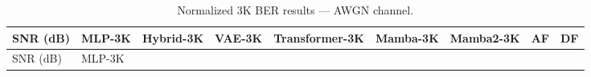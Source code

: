 \begin{longtable}[]{@{}
  >{\raggedright\arraybackslash}p{}
  >{\raggedright\arraybackslash}p{}
  >{\raggedright\arraybackslash}p{}
  >{\raggedright\arraybackslash}p{}
  >{\raggedright\arraybackslash}p{}
  >{\raggedright\arraybackslash}p{}
  >{\raggedright\arraybackslash}p{}
  >{\raggedright\arraybackslash}p{}
  >{\raggedright\arraybackslash}p{}@{}}
\caption{Normalized 3K BER results --- AWGN channel.}\label{tbl:table7}\tabularnewline
\toprule\noalign{}
\begin{minipage}[b]{\linewidth}\raggedright
SNR (dB)
\end{minipage} & \begin{minipage}[b]{\linewidth}\raggedright
MLP-3K
\end{minipage} & \begin{minipage}[b]{\linewidth}\raggedright
Hybrid-3K
\end{minipage} & \begin{minipage}[b]{\linewidth}\raggedright
VAE-3K
\end{minipage} & \begin{minipage}[b]{\linewidth}\raggedright
Transformer-3K
\end{minipage} & \begin{minipage}[b]{\linewidth}\raggedright
Mamba-3K
\end{minipage} & \begin{minipage}[b]{\linewidth}\raggedright
Mamba2-3K
\end{minipage} & \begin{minipage}[b]{\linewidth}\raggedright
AF
\end{minipage} & \begin{minipage}[b]{\linewidth}\raggedright
DF
\end{minipage} \\
\midrule\noalign{}
\endfirsthead
\toprule\noalign{}
\begin{minipage}[b]{\linewidth}\raggedright
SNR (dB)
\end{minipage} & \begin{minipage}[b]{\linewidth}\raggedright
MLP-3K
\end{minipage} & \begin{minipage}[b]{\linewidth}\raggedright

\end{minipage}
\end{longtable}
